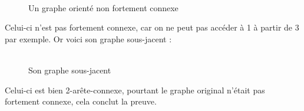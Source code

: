 \documentclass{article}      %
\begin{document}
\begin{figure}[H]
    \centering
    \\Un graphe orienté non fortement connexe
\end{figure}

Celui-ci n'est pas fortement connexe, car on ne peut pas accéder à 1 à partir de 3 par exemple.
Or voici son graphe sous-jacent :
\begin{figure}[H]
    \centering
    \\Son graphe sous-jacent
\end{figure}
Celui-ci est bien 2-arête-connexe, pourtant le graphe original n'était pas fortement connexe, cela conclut la preuve.
\end{document}
